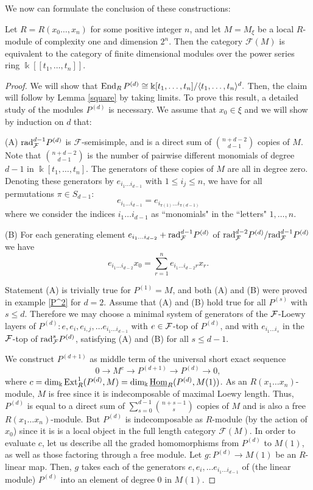 \documentclass[10pt]{amsart}
\begin{document}
\noindent  We now can formulate the conclusion of these constructions:
%
\begin{thm}\label{nilmod} Let $R=R(x_0\ldots ,x_n)$ for some positive integer $n$, and let $M=M_{\xi}$ be a local $R$-module of complexity one and dimension $2^n$. Then the category $\mathcal F(M)$ is 
equivalent to the category of finite dimensional modules over the power series ring $\Bbbk[[t_1,\ldots ,t_n]]$.  
\end{thm}
%
\begin{proof} We will show that  $\operatorname{End}_RP^{(d)}\cong\Bbbk [t_1,\ldots ,t_n]/{\langle t_1,\ldots ,t_n\rangle^d}.$ Then, the claim will follow by Lemma \ref{square} by taking limits.
To prove this result, a detailed study of the modules $P^{(d)}$ is necessary. We assume that $x_0\in\xi$ and
we will show by induction on $d$ that:

\medskip
\noindent (A)  $\mbox{rad}_{\mathcal F}^{d-1}P^{(d)}$ is $\mathcal F$-semisimple, and is a direct sum of $\binom{n+d-2}{d-1}$ copies of $M$.  Note that $\binom{n+d-2}{d-1}$ is the number of pairwise different monomials of degree $d-1$ in
$\Bbbk [t_1,\ldots ,t_n]$.
The generators of these copies of $M$ are all in degree zero. Denoting these generators by $e_{i_1\ldots i_{d-1}}$
with $1\leq i_j \leq n$, we have for all permutations $\pi\in S_{d-1}$:
 $$e_{i_1\ldots i_{d-1}}=  e_{i_{\pi(1)}\ldots i_{\pi(d-1)}}$$
 \noindent where we consider the indices ${i_1\ldots i_{d-1}}$ as ``monomials" in the ``letters" $1,\ldots ,n$.
 
 \medskip
 \noindent (B)  For each generating element $e_{i_1\ldots i_{d-2}}+\mbox{rad}_{\mathcal F}^{d-1}P^{(d)}$ of $\mbox{rad}_{\mathcal F}^{d-2}P^{(d)}/{\mbox{rad}_{\mathcal F}^{d-1}P^{(d)}}$ 
 we have
$$e_{i_1\ldots i_{d-2}}x_0=\sum_{r=1}^ne_{i_1\ldots i_{d-2}r}x_r.$$

\noindent Statement (A) is trivially true for $P^{(1)} =M$, and both (A) and (B) were proved in example \ref{P^2} for $d=2$.
Assume that (A) and (B) hold true for all $P^{(s)}$ with $s\leq d$. Therefore we may choose a minimal
system of generators of the $\mathcal F$-Loewy layers of $P^{(d)}\colon e, e_i, e_{i,j},\ldots e_{i_1\ldots i_{d-1}}$ with $e\in\mathcal F$-top of $P^{(d)}$,
and with $e_{i_1\ldots i_s}$ in the $\mathcal F$-top of $\mbox{rad}_{\mathcal F}^sP^{(d)}$, satisfying (A) and (B) for all $s\leq d-1$.

\smallskip
\noindent We construct $P^{(d+1)}$ as middle term of the universal short exact sequence
$$0\to M^c\to P^{(d+1)}\to P^{(d)}\to 0,$$ where $c=\operatorname{dim}\nolimits_{\Bbbk}\operatorname{Ext}\nolimits_R^1(P^{(d)},M)=\operatorname{dim}\nolimits_{\Bbbk}\underline{\operatorname{Hom}}_R(P^{(d)},M(1))$. As an $R(x_1\ldots x_n)$-module, $M$ is free since it is indecomposable of maximal Loewy length. Thus, $P^{(d)}$
is equal to a direct sum of $\sum_{s=0}^{d-1}\binom{n+s-1}{s}$ copies of $M$ and is also a free $R(x_1\ldots x_n)$-module.
But $P^{(d)}$ is indecomposable as $R$-module (by the action of $x_0$) since it is  is a local object in the 
full length category $\mathcal F(M)$. In order to evaluate $c$, let us describe all the graded homomorphisms from $P^{(d)}$ to $M(1)$, as well as those factoring through a free module. 
 Let $g\colon P^{(d)}\to M(1)$ be an $R$-linear map.  Then, $g$ takes each of 
the generators $e, e_i, \ldots e_{i_1\ldots i_{d-1}}$ of (the linear module) $P^{(d)}$ into an element of degree $0$ in $M(1)$.


\end{proof}
\end{document}
